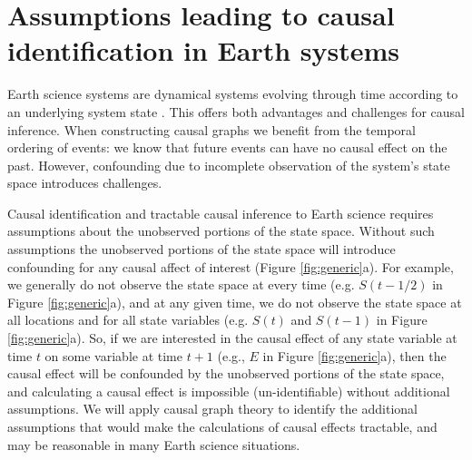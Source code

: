 \documentclass[12pt]{article}
\begin{document}
\section{Assumptions leading to causal identification in Earth
  systems}
\label{sec:necess-cond-caus}

Earth science systems are dynamical systems evolving through time
according to an underlying system state
\citep{lorenz-1963,lorenz1996predictability,majda-state}. This offers
both advantages and challenges for causal inference. When constructing
causal graphs we benefit from the temporal ordering of events: we know
that future events can have no causal effect on the past. However,
confounding due to incomplete observation of the system's state space
introduces challenges.


Causal identification and tractable causal inference to Earth science
requires assumptions about the unobserved portions of the state
space. Without such assumptions the unobserved portions of the state
space will introduce confounding for any causal affect of interest
(Figure \ref{fig:generic}a). For example, we generally do not observe
the state space at every time (e.g. $S(t-1/2)$ in Figure
\ref{fig:generic}a), and at any given time, we do not observe the
state space at all locations and for all state variables (e.g. $S(t)$
and $S(t-1)$ in Figure \ref{fig:generic}a). So, if we are interested
in the causal effect of any state variable at time $t$ on some
variable at time $t+1$ (e.g., $E$ in Figure \ref{fig:generic}a), then
the causal effect will be confounded by the unobserved portions of the
state space, and calculating a causal effect is impossible
(un-identifiable) without additional assumptions. We will apply causal
graph theory to identify the additional assumptions that would make
the calculations of causal effects tractable, and may be reasonable in
many Earth science situations.
\end{document}
